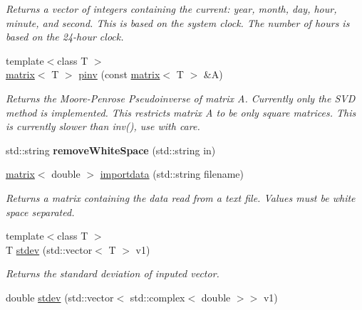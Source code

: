 \begin{DoxyCompactItemize}
\begin{DoxyCompactList}\small\item\em Returns a vector of integers containing the current\-: year, month, day, hour, minute, and second. This is based on the system clock. The number of hours is based on the 24-\/hour clock. \end{DoxyCompactList}\item 
\hypertarget{namespacekeycpp_ac20bd2ef4fb18cbcdb0f462a89447bd7}{{\footnotesize template$<$class T $>$ }\\\hyperlink{classkeycpp_1_1matrix}{matrix}$<$ T $>$ \hyperlink{namespacekeycpp_ac20bd2ef4fb18cbcdb0f462a89447bd7}{pinv} (const \hyperlink{classkeycpp_1_1matrix}{matrix}$<$ T $>$ \&A)}\label{namespacekeycpp_ac20bd2ef4fb18cbcdb0f462a89447bd7}

\begin{DoxyCompactList}\small\item\em Returns the Moore-\/\-Penrose Pseudoinverse of matrix A. Currently only the S\-V\-D method is implemented. This restricts matrix A to be only square matrices. This is currently slower than inv(), use with care. \end{DoxyCompactList}\item 
\hypertarget{namespacekeycpp_ad70d9156c4b6a75e5b7a4c799f900162}{std\-::string {\bfseries remove\-White\-Space} (std\-::string in)}\label{namespacekeycpp_ad70d9156c4b6a75e5b7a4c799f900162}

\item 
\hypertarget{namespacekeycpp_ac5c0a8bc58229a412ec2068979b6b84e}{\hyperlink{classkeycpp_1_1matrix}{matrix}$<$ double $>$ \hyperlink{namespacekeycpp_ac5c0a8bc58229a412ec2068979b6b84e}{importdata} (std\-::string filename)}\label{namespacekeycpp_ac5c0a8bc58229a412ec2068979b6b84e}

\begin{DoxyCompactList}\small\item\em Returns a matrix containing the data read from a text file. Values must be white space separated. \end{DoxyCompactList}\item 
\hypertarget{namespacekeycpp_aaadf411a742cc75864477e1f1bc82ce8}{{\footnotesize template$<$class T $>$ }\\T \hyperlink{namespacekeycpp_aaadf411a742cc75864477e1f1bc82ce8}{stdev} (std\-::vector$<$ T $>$ v1)}\label{namespacekeycpp_aaadf411a742cc75864477e1f1bc82ce8}

\begin{DoxyCompactList}\small\item\em Returns the standard deviation of inputed vector. \end{DoxyCompactList}\item 
\hypertarget{namespacekeycpp_a6b9edabfd1ccca244f0ea077ab3ba363}{double \hyperlink{namespacekeycpp_a6b9edabfd1ccca244f0ea077ab3ba363}{stdev} (std\-::vector$<$ std\-::complex$<$ double $>$$>$ v1)}\label{namespacekeycpp_a6b9edabfd1ccca244f0ea077ab3ba363}


\end{DoxyCompactItemize}
